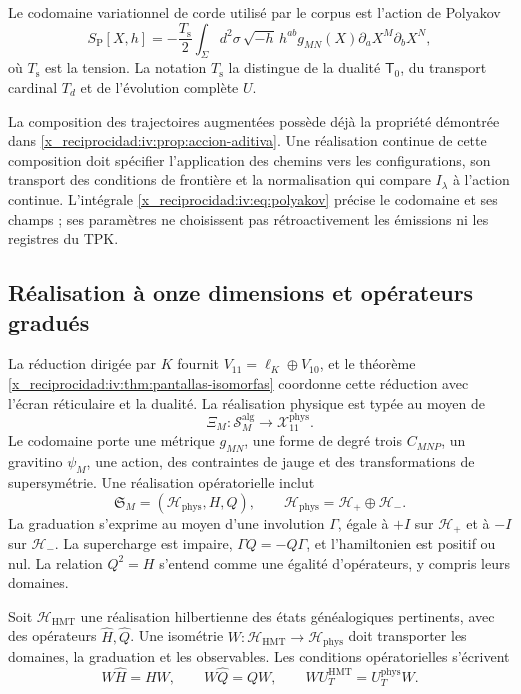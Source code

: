 Le codomaine variationnel de corde utilisé par le corpus
est l’action de Polyakov
\begin{equation}
 S_{\mathrm P}[X,h]
 =-\frac{T_{\mathrm s}}2\int_\Sigma d^2\sigma\,
 \sqrt{-h}\,h^{ab}g_{MN}(X)
             \partial_aX^M\partial_bX^N,
 \label{x_reciprocidad:iv:eq:polyakov}
\end{equation}
où \(T_{\mathrm s}\) est la tension. La notation
\(T_{\mathrm s}\) la distingue de la dualité
\(\mathsf T_0\), du transport cardinal \(T_d\)
et de l’évolution complète \(U\).

La composition des trajectoires augmentées possède déjà la
propriété démontrée dans \ref{x_reciprocidad:iv:prop:accion-aditiva}.
Une réalisation continue de cette composition doit
spécifier l’application des chemins vers les configurations,
son transport des conditions de frontière et la
normalisation qui compare \(I_\lambda\) à l’action
continue. L’intégrale \eqref{x_reciprocidad:iv:eq:polyakov} précise
le codomaine et ses champs ; ses paramètres ne choisissent pas
rétroactivement les émissions ni les registres du TPK.

\subsection{Réalisation à onze dimensions et opérateurs gradués}

La réduction dirigée par \(K\) fournit
\(V_{11}=\ell_K\oplus V_{10}\), et le théorème
\ref{x_reciprocidad:iv:thm:pantallas-isomorfas} coordonne cette réduction
avec l’écran réticulaire et la dualité. La réalisation
physique est typée au moyen de
\[
 \Xi_M:\mathscr S_M^{\mathrm{alg}}
                  \longrightarrow\mathcal X_{11}^{\mathrm{phys}}.
\]
Le codomaine porte une métrique \(g_{MN}\), une forme de degré trois
\(C_{MNP}\), un gravitino \(\psi_M\), une action,
des contraintes de jauge et des transformations de
supersymétrie. Une réalisation opératorielle inclut
\[
 \mathfrak S_M=(\mathcal H_{\mathrm{phys}},H,Q),\qquad
 \mathcal H_{\mathrm{phys}}=\mathcal H_+\oplus\mathcal H_-.
\]
La graduation s’exprime au moyen d’une involution
\(\Gamma\), égale à \(+I\) sur \(\mathcal H_+\)
et à \(-I\) sur \(\mathcal H_-\). La supercharge
est impaire, \(\Gamma Q=-Q\Gamma\), et
l’hamiltonien est positif ou nul. La relation
\(Q^2=H\) s’entend comme une égalité d’opérateurs,
y compris leurs domaines.

Soit \(\mathcal H_{\mathrm{HMT}}\) une réalisation
hilbertienne des états généalogiques pertinents,
avec des opérateurs \(\widehat H,\widehat Q\). Une
isométrie \(W:\mathcal H_{\mathrm{HMT}}\to
\mathcal H_{\mathrm{phys}}\) doit transporter
les domaines, la graduation et les observables. Les conditions
opératorielles s’écrivent
\begin{equation}
 W\widehat H=HW,\qquad
 W\widehat Q=QW,\qquad
 WU_T^{\mathrm{HMT}}=U_T^{\mathrm{phys}}W.
 \label{x_reciprocidad:iv:eq:entrelazamiento-fisico}
\end{equation}

